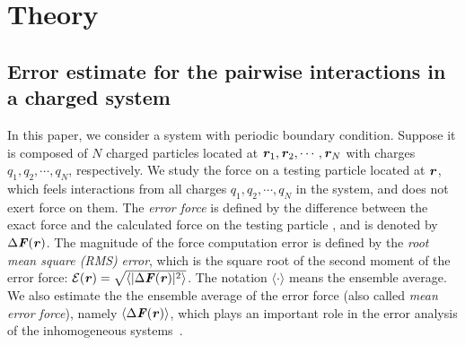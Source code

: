 \documentclass[aps,pre,preprint,unsortedaddress]{revtex4}
\newcommand{\recheck}[1]{{\color{red} #1}}
\newcommand{\redc}[1]{{\color{red} #1}}
\renewcommand{\v}[1]{\textbf{\textit{#1}}}
\begin{document}




\section{Theory}

\subsection{Error estimate for
  the pairwise interactions in a charged system}

In this paper, we consider a system with periodic boundary condition.
Suppose it is
composed \redc{of} $N$ charged particles located at $\v r_1, \v r_2, \cdots,
\v r_N$ with charges $q_1, q_2, \cdots, q_N$, respectively.
We study the force \redc{on} a testing particle located at $\v r$, which
feels interactions from all charges $q_1, q_2, \cdots, q_N$
in the system, and does not
exert force on them.
The \emph{error force} is defined by the difference between
the exact force and the calculated
force on the testing particle
\cite{wang2012}, and is denoted by $\Delta \v F(\v r)$.
The magnitude of the force computation error 
is defined by the \emph{root mean square (RMS)} \emph{error}, which is
the square root of the second moment of the error force: $\mathcal
E(\v r) = \sqrt{\langle\vert\Delta\v F(\v r)\vert^2\rangle}$.  The
notation $\langle\cdot\rangle$ means the ensemble average.  We also
estimate the the ensemble average of the error force (also called
\emph{mean error force}), namely $\langle\Delta\v F(\v r)\rangle$,
which plays an important role in the error analysis of the
inhomogeneous systems~\cite{wang2012}.
\end{document}
